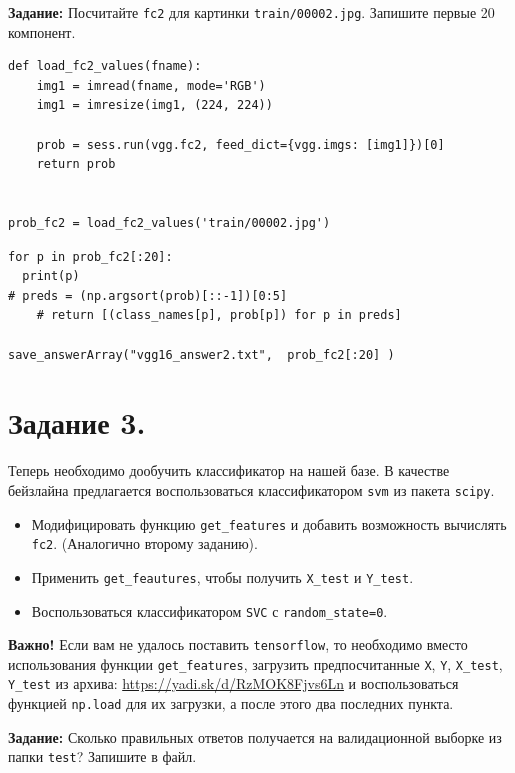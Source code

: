 \documentclass[11pt,a4paper]{article}
\begin{document}
\textbf{Задание:} Посчитайте \texttt{fc2} для картинки \texttt{train/00002.jpg}.  Запишите первые 20 компонент.

\begin{verbatim}
def load_fc2_values(fname):
    img1 = imread(fname, mode='RGB')
    img1 = imresize(img1, (224, 224))
    
    prob = sess.run(vgg.fc2, feed_dict={vgg.imgs: [img1]})[0]
    return prob
    

prob_fc2 = load_fc2_values('train/00002.jpg')
\end{verbatim}

\begin{verbatim}
for p in prob_fc2[:20]:
  print(p)
# preds = (np.argsort(prob)[::-1])[0:5]
    # return [(class_names[p], prob[p]) for p in preds]
   
save_answerArray("vgg16_answer2.txt",  prob_fc2[:20] )
\end{verbatim}

\section{Задание 3.}

Теперь необходимо дообучить классификатор на нашей базе. В качестве бейзлайна предлагается воспользоваться классификатором \texttt{svm} из пакета \texttt{scipy}.

\begin{itemize}
\item Модифицировать функцию \texttt{get_features} и добавить возможность вычислять \texttt{fc2}. (Аналогично второму заданию).
\item Применить \texttt{get_feautures}, чтобы получить \texttt{X_test} и \texttt{Y_test}.
\item Воспользоваться классификатором \texttt{SVC} с \texttt{random_state=0}.
\end{itemize}

\textbf{Важно!} Если вам не удалось поставить \texttt{tensorflow}, то необходимо вместо использования функции \texttt{get_features}, загрузить предпосчитанные \texttt{X}, \texttt{Y}, \texttt{X_test}, \texttt{Y_test} из архива: \href{https://yadi.sk/d/RzMOK8Fjvs6Ln}{https://yadi.sk/d/RzMOK8Fjvs6Ln} и воспользоваться функцией \texttt{np.load} для их загрузки, а после этого два последних пункта.

\textbf{Задание:} Сколько правильных ответов получается на валидационной выборке из папки \texttt{test}? Запишите в файл.
\end{document}
